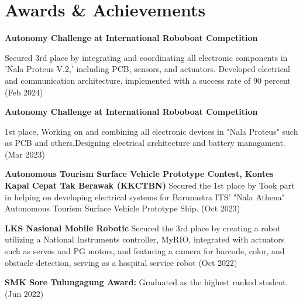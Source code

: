 \documentclass[letterpaper,11pt]{article}
\newcommand{\resumeSubHeadingListStart}{\begin{itemize}[leftmargin=0.15in, label={}]}
\newcommand{\resumeSubHeadingListEnd}{\end{itemize}}
\begin{document}
\section{Awards \& Achievements}
  \vspace{2pt}
  \resumeSubHeadingListStart
    \small{\item{
        \textbf{Autonomy Challenge at International Roboboat Competition}{ Secured 3rd place by integrating and coordinating all electronic components in 'Nala Proteus V.2,' including PCB, sensors, and actuators. Developed electrical and communication architecture, implemented with a success rate of 90 percent {(Feb 2024)} \\ \vspace{3pt}
        
        \textbf{Autonomy Challenge at International Roboboat Competition}{ 1st place, Working on and combining all electronic devices in "Nala Proteus" such as PCB and others.Designing electrical architecture and battery managament. {(Mar 2023)} \\ \vspace{3pt}
        
        \textbf{Autonomous Tourism Surface Vehicle Prototype Contest, Kontes Kapal Cepat Tak Berawak (KKCTBN)}{ Secured the 1st place by Took part in helping on developing electrical systems for Barunastra ITS' "Nala Athena" Autonomous Tourism Surface Vehicle Prototype Ship. (Oct 2023)} \\ \vspace{3pt}
        
        \textbf{LKS Nasional Mobile Robotic}{ Secured the 3rd place by creating a robot utilizing a National Instruments controller, MyRIO, integrated with actuators such as servos and PG motors, and featuring a camera for barcode, color, and obstacle detection, serving as a hospital service robot (Oct 2022)} \\ \vspace{3pt}
        
        \textbf{SMK Sore Tulungagung Award:}{ Graduated as the highest ranked student. (Jun 2022)}
    }}}}
\resumeSubHeadingListEnd



\end{document}
